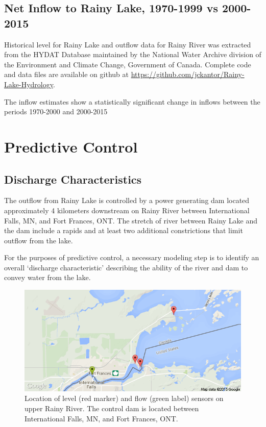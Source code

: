 \documentclass[preprint,times]{elsarticle}
\begin{document}
\subsection{Net Inflow to Rainy Lake, 1970-1999 vs 2000-2015}

Historical level for Rainy Lake and outflow data for Rainy River was extracted from the HYDAT Database maintained by the National Water Archive division of the Environment and Climate Change, Government of Canada. Complete code and data files are available on github at \url{https://github.com/jckantor/Rainy-Lake-Hydrology}.

The inflow estimates show a statistically significant change in inflows between the periods 1970-2000 and 2000-2015

\section{Predictive Control}

\subsection{Discharge Characteristics}

The outflow from Rainy Lake is controlled by a power generating dam located approximately 4 kilometers downstream on Rainy River between International Falls, MN, and Fort Frances, ONT. The stretch of river between Rainy Lake and the dam include a rapids and at least two additional constrictions that limit outflow from the lake. 

For the purposes of predictive control, a necessary modeling step is to identify an overall `discharge characteristic' describing the ability of the river and dam to convey water from the lake.

\begin{figure}
\includegraphics[width=\linewidth]{rlmap}
\caption{Location of level (red marker) and flow (green label) sensors on upper Rainy River. The control dam is located between International Falls, MN, and Fort Frances, ONT.}\label{figure:8}
\end{figure}
\end{document}
